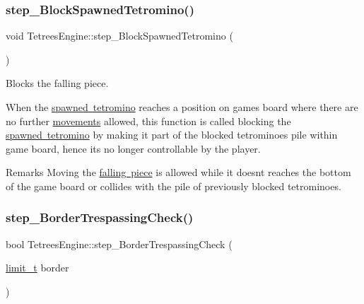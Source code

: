 \subsubsection{\texorpdfstring{step\+\_\+\+Block\+Spawned\+Tetromino()}{step\_BlockSpawnedTetromino()}}
{\footnotesize\ttfamily void Tetrees\+Engine\+::step\+\_\+\+Block\+Spawned\+Tetromino (\begin{DoxyParamCaption}{ }\end{DoxyParamCaption})\hspace{0.3cm}{\ttfamily [private]}}



Blocks the falling piece. 

When the \mbox{\hyperlink{classTetreesEngine_a26435ee2f02d9ba70d9e359745114f6e}{spawned tetromino}} reaches a position on game\textquotesingle{}s board where there are no further \mbox{\hyperlink{TetreesDefs_8hpp_a4d5a793092a473f85b4c1f7faf62afed}{movements}} allowed, this function is called blocking the \mbox{\hyperlink{classTetreesEngine_a26435ee2f02d9ba70d9e359745114f6e}{spawned tetromino}} by making it part of the blocked tetrominoes pile within game board, hence it\textquotesingle{}s no longer controllable by the player. \begin{DoxyRemark}{Remarks}
Moving the \mbox{\hyperlink{classTetreesEngine_a26435ee2f02d9ba70d9e359745114f6e}{falling piece}} is allowed while it doesn\textquotesingle{}t reaches the bottom of the game board or collides with the pile of previously blocked tetrominoes. 
\end{DoxyRemark}
\mbox{\label{classTetreesEngine_aa593f5f688e984a2cdbbf83b162d00a2}} 
\subsubsection{\texorpdfstring{step\+\_\+\+Border\+Trespassing\+Check()}{step\_BorderTrespassingCheck()}}
{\footnotesize\ttfamily bool Tetrees\+Engine\+::step\+\_\+\+Border\+Trespassing\+Check (\begin{DoxyParamCaption}\item[{\mbox{\hyperlink{TetreesDefs_8hpp_a5dbb1ebfe8a9b95707ac161d3549ed8a}{limit\+\_\+t}}}]{border }\end{DoxyParamCaption})\hspace{0.3cm}{\ttfamily [private]}}



